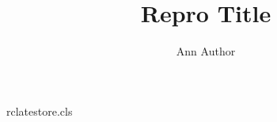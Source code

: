 \begin{filecontents*}[overwrite]{rclatestore.cls}
\newcommand*\resumen[1]{\gdef\@resumen{#1}}
\def\@resumen{}
\def\@maketitle{\@title\par\@author\par Resumen: \@resumen\par}
\end{filecontents*}
\documentclass{rclatestore}
\title{Repro Title}\author{Ann Author}

\maketitle
\begin{center}Department of Repro, University of Witness\end{center}
\begin{abstract}English abstract words.\end{abstract}
\section{Intro}Body text.

